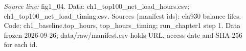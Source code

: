 {\scriptsize\textit{Source line:} fig1\_\allowbreak{}04. Data: ch1\_\allowbreak{}top100\_\allowbreak{}net\_\allowbreak{}load\_\allowbreak{}hours.csv; ch1\_\allowbreak{}top100\_\allowbreak{}net\_\allowbreak{}load\_\allowbreak{}timing.csv. Sources (manifest ids): eia930 balance files. Code: ch1\_\allowbreak{}baseline.top\_\allowbreak{}hours, top\_\allowbreak{}hours\_\allowbreak{}timing; run\_\allowbreak{}chapter1 step 1. Data frozen 2026-09-26; data/raw/manifest.csv holds URL, access date and SHA-256 for each id.}